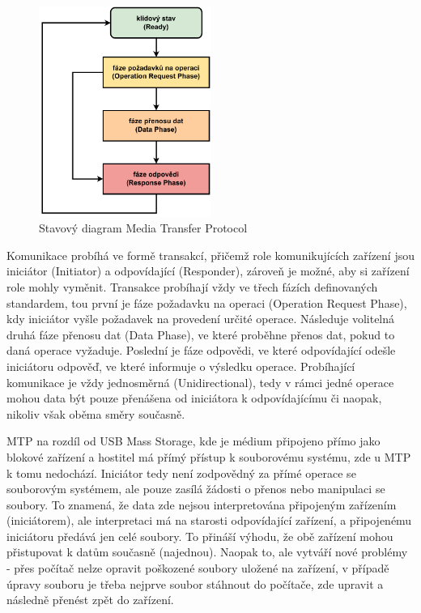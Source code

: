 \begin{figure}[h]
    \centering
    \includegraphics[width=0.50\textwidth]{obrazky-figures/mtp_phases-cz.pdf}
    
    \caption{Stavový diagram Media Transfer Protocol \cite{silicon_labs_mass_storage_protocol}}
    \label{fig:mtp-protocol}
\end{figure}

Komunikace probíhá ve formě transakcí, přičemž role komunikujících zařízení jsou iniciátor (Initiator) a odpovídající (Responder), zároveň je možné, aby si zařízení role mohly vyměnit. Transakce probíhají vždy ve třech fázích definovaných standardem, tou první je fáze požadavku na operaci (Operation Request Phase), kdy iniciátor vyšle požadavek na provedení určité operace. Následuje volitelná druhá fáze přenosu dat (Data Phase), ve které proběhne přenos dat, pokud to daná operace vyžaduje. Poslední je fáze odpovědi, ve které odpovídající odešle iniciátoru odpověď, ve které informuje o výsledku operace. Probíhající komunikace je vždy jednosměrná (Unidirectional), tedy v rámci jedné operace mohou data být pouze přenášena od iniciátora k odpovídajícímu či naopak, nikoliv však oběma směry současně. 


MTP na rozdíl od USB Mass Storage, kde je médium připojeno přímo jako blokové zařízení a hostitel má přímý přístup k souborovému systému, zde u MTP k tomu nedochází. Iniciátor tedy není zodpovědný za přímé operace se souborovým systémem, ale pouze zasílá žádosti o přenos nebo manipulaci se soubory. To znamená, že data zde nejsou interpretována připojeným zařízením (iniciátorem), ale interpretaci má na starosti odpovídající zařízení, a připojenému iniciátoru předává jen celé soubory. To přináší výhodu, že obě zařízení mohou přistupovat k datům současně (najednou). Naopak to, ale vytváří nové problémy - přes počítač nelze opravit poškozené soubory uložené na zařízení, v případě úpravy souboru je třeba nejprve soubor stáhnout do počítače, zde upravit a následně přenést zpět do zařízení.

